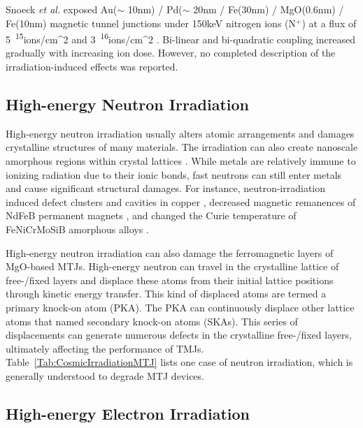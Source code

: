 \documentclass[molecules,review,submit,pdftex,moreauthors]{Definitions/mdpi}
\begin{document}
Snoeck \textit{et al.} exposed Au($\sim$ 10nm) / Pd($\sim$ 20nm / Fe(30nm) / MgO(0.6nm) / Fe(10nm) magnetic tunnel junctions under \unit{150}{keV} nitrogen ions (N$^+$) at a flux of \unit{5 ^{15}}{ions/cm^2} and \unit{3 ^{16}}{ions/cm^2} \cite{Snoeck2008JP}.  Bi-linear and bi-quadratic coupling increased gradually with increasing ion dose.  However, no completed description of the irradiation-induced effects was reported. 




\subsection{High-energy Neutron Irradiation}


High-energy neutron irradiation usually alters atomic arrangements and damages crystalline structures of many materials.  The irradiation can also create nanoscale amorphous regions within crystal lattices \cite{Martinelli2008SST}.  While metals are relatively immune to ionizing radiation due to their ionic bonds, fast neutrons can still enter metals and cause significant structural damages.  For instance, neutron-irradiation induced defect clusters and cavities in copper \cite{Singh1995JNM}, decreased magnetic remanences of NdFeB permanent magnets \cite{Cost1988IEEE}, and changed the Curie temperature of FeNiCrMoSiB amorphous alloys \cite{Skorvanek2006PSSa}.   


High-energy neutron irradiation can also damage the ferromagnetic layers of MgO-based MTJs.   
High-energy neutron can travel in the crystalline lattice of free-/fixed layers and displace these atoms from their initial lattice positions through kinetic energy transfer.   This kind of displaced atoms are termed a primary knock-on atom (PKA).  The PKA can continuously displace other lattice atoms that named  secondary knock-on atoms (SKAs).  This series of displacements can generate numerous defects in the crystalline free-/fixed layers, ultimately affecting the performance of TMJs. Table~\ref{Tab:CosmicIrradiationMTJ} lists one case of neutron irradiation, which is generally understood to degrade MTJ devices.


\subsection{High-energy Electron Irradiation}
\end{document}
